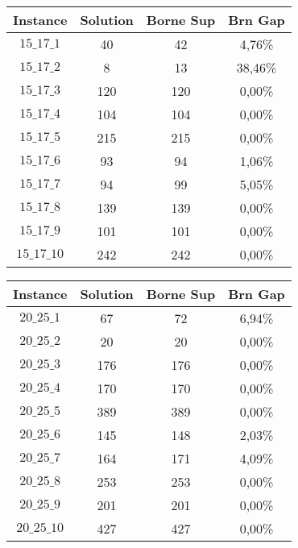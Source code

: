 \documentclass[a4paper, 11pt]{article} %
\begin{document}
\begin{center}
\begin{figure}[H]
   \begin{minipage}[c]{.46\linewidth}
      \begin{tabular}{|c|c|c|c|}
      \hline 
        Instance & Solution & Borne Sup & Brn Gap  \\ \hline
$15\_17\_1$ & 40 &  42 &  4,76\% \\ \hline
$15\_17\_2$ & 8 & 13 &  38,46\% \\ \hline
$15\_17\_3$ & 120 & 120 & 0,00\% \\ \hline
$15\_17\_4$ & 104 & 104 & 0,00\% \\ \hline
$15\_17\_5$ & 215 & 215 & 0,00\% \\ \hline
$15\_17\_6$ & 93 &  94 &  1,06\% \\ \hline
$15\_17\_7$ & 94 &  99 &  5,05\% \\ \hline
$15\_17\_8$ & 139 & 139 & 0,00\% \\ \hline
$15\_17\_9$ & 101 & 101 & 0,00\% \\ \hline
$15\_17\_10$ & 242 & 242 & 0,00\% \\ \hline
      \end{tabular}
   \end{minipage} \hfill
   \begin{minipage}[c]{.46\linewidth}
      \begin{tabular}{|c|c|c|c|}
      \hline 
        Instance & Solution & Borne Sup & Brn Gap  \\ \hline
$20\_25\_1$ & 67 &  72 &  6,94\% \\ \hline
$20\_25\_2$ & 20 &  20 &  0,00\% \\ \hline
$20\_25\_3$ & 176 & 176 & 0,00\% \\ \hline
$20\_25\_4$ & 170 & 170 & 0,00\% \\ \hline
$20\_25\_5$ & 389 & 389 & 0,00\% \\ \hline
$20\_25\_6$ & 145 & 148 & 2,03\% \\ \hline
$20\_25\_7$ & 164 & 171 & 4,09\% \\ \hline
$20\_25\_8$ & 253 & 253 & 0,00\% \\ \hline
$20\_25\_9$ & 201 & 201 & 0,00\% \\ \hline
$20\_25\_10$ & 427 & 427 & 0,00\% \\ \hline
      \end{tabular}
   \end{minipage}
\end{figure}


\end{center}
\end{document}
